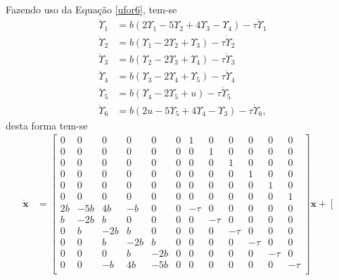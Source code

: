 \documentclass[a4paper,11pt]{scrartcl} %
\numberwithin{equation}{section} %
\numberwithin{figure}{section} %
\numberwithin{table}{section} %
\begin{document}
\paragraph{} Fazendo uso da Equação \ref{ufor6}, tem-se \begin{align}
 	\ddot{\Upsilon}_1 &=  b\left(2\Upsilon_{1}-5\Upsilon_{2} + 4\Upsilon_{3} -\Upsilon_{4}\right)-\tau \dot{\Upsilon}_1\\
 	\ddot{\Upsilon}_2 &=  b\left(\Upsilon_{1}-2\Upsilon_{2} + \Upsilon_{3}\right)-\tau \dot{\Upsilon}_2\\
 	\ddot{\Upsilon}_3 &=  b\left(\Upsilon_{2}-2\Upsilon_{3} + \Upsilon_{4}\right)-\tau \dot{\Upsilon}_3\\
 	\ddot{\Upsilon}_4 &=  b\left(\Upsilon_{3}-2\Upsilon_{4} + \Upsilon_{5}\right)-\tau \dot{\Upsilon}_4\\
 	\ddot{\Upsilon}_5 &=  b\left(\Upsilon_{4}-2\Upsilon_{5} + u\right)-\tau \dot{\Upsilon}_5\\
 	\ddot{\Upsilon}_6 &=  b\left(2u-5\Upsilon_{5} + 4\Upsilon_{4} -\Upsilon_{3}\right)-\tau \dot{\Upsilon}_6,
 \end{align} desta forma tem-se \begin{align}
 	\mathbf{\dot{x}} &= \left[\begin{array}{cccccccccccc}
 		0 & 0 & 0 & 0 & 0 & 0 & 1 & 0 & 0 & 0 & 0 & 0\\
 		0 & 0 & 0 & 0 & 0 & 0 & 0 & 1 & 0 & 0 & 0 & 0\\
 		0 & 0 & 0 & 0 & 0 & 0 & 0 & 0 & 1 & 0 & 0 & 0\\
 		0 & 0 & 0 & 0 & 0 & 0 & 0 & 0 & 0 & 1 & 0 & 0\\
 		0 & 0 & 0 & 0 & 0 & 0 & 0 & 0 & 0 & 0 & 1 & 0\\
 		0 & 0 & 0 & 0 & 0 & 0 & 0 & 0 & 0 & 0 & 0 & 1\\
 		2b & -5b & 4b & -b & 0 & 0 & -\tau & 0     & 0 & 0 & 0 & 0\\
 		b & -2b  & b  & 0  & 0 & 0 &  0    & -\tau & 0 & 0 & 0 & 0\\
 		0 & b & -2b  & b  & 0  & 0 & 0 &  0    & -\tau & 0 & 0 & 0\\
 		0 & 0 & b & -2b  & b  & 0  & 0 & 0 &  0    & -\tau & 0 & 0\\
 		0 & 0 & 0 & b & -2b  & 0  & 0  & 0 & 0 &  0    & -\tau & 0\\
 		0 & 0 & -b & 4b & -5b & 0  & 0  & 0 & 0 &  0    & 0   &-\tau\\
 	\end{array}\right]\mathbf{x} + \left[\begin{array}{c}

\end{array}
\end{align}
\end{document}
